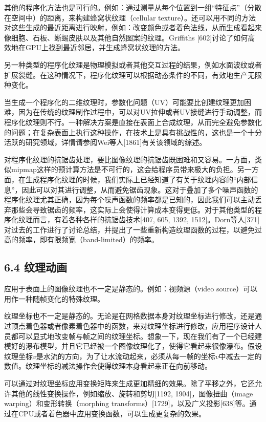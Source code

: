 \documentclass[
  paper=a4,
  ,captions=tableheading
]{scrartcl}
\begin{document}
其他的程序化方法也是可行的。例如：通过测量从每个位置到一组``特征点''（分散在空间中）的距离，来构建蜂窝状纹理（cellular
texture）。还可以用不同的方法对这些生成的最近距离进行映射，例如：改变颜色或者着色法线，从而生成看起来像细胞、石板、蜥蜴皮肤以及其他自然图案的纹理。Griffiths
{[}602{]}讨论了如何高效地在GPU上找到最近邻居，并生成蜂窝状纹理的方法。

另一种类型的程序化纹理是物理模拟或者其他交互过程的结果，例如水面波纹或者扩展裂缝。在这种情况下，程序化纹理可以根据动态条件的不同，有效地生产无限种变化。

当生成一个程序化的二维纹理时，参数化问题（UV）可能要比创建纹理更加困难，因为在传统的纹理制作过程中，可以对UV拉伸或者UV接缝进行手动调整，而程序化纹理则不行。一种解决方案是直接在表面上合成纹理，从而完全避免参数化的问题；在复杂表面上执行这种操作，在技术上是具有挑战性的，这也是一个十分活跃的研究领域，详情请参阅Wei等人{[}1861{]}有关该领域的综述。

对程序化纹理的抗锯齿处理，要比图像纹理的抗锯齿既困难和又容易。一方面，类似mipmap这样的预计算方法是不可行的，这会给程序员带来极大的负担。另一方面，在生成程序化纹理的时候，我们实际上已经知道了有关于纹理内容的``内部信息''，因此可以对其进行调整，从而避免锯齿现象。这对于叠加了多个噪声函数的程序化纹理尤其正确，因为每个噪声函数的频率都是已知的，因此我们可以主动丢弃那些会导致锯齿的频率，这实际上会使得计算成本变得更低。对于其他类型的程序化纹理而言，有着各种各样的抗锯齿技术{[}407,
605, 1392,
1512{]}。Dorn等人{[}371{]}对过去的工作进行了讨论总结，并提出了一些重新构造纹理函数的过程，以避免过高的频率，即有限频宽（band-limited）的频率。

\subsection{6.4 纹理动画}\label{ux7eb9ux7406ux52a8ux753b}

应用于表面上的图像纹理也不一定是静态的。例如：视频源（video
source）可以用作一种随帧变化的特殊纹理。

纹理坐标也不一定是静态的。无论是在网格数据本身对纹理坐标进行修改，还是通过顶点着色器或者像素着色器中的函数，来对纹理坐标进行修改，应用程序设计人员都可以显式地改变帧与帧之间的纹理坐标。想象一下，现在我们有了一个已经建模好的瀑布模型，并且它已经被一个图像纹理化了，使得它看起来很像瀑布。假设纹理坐标\(v\)是水流的方向，为了让水流动起来，必须从每一帧的坐标\(v\)中减去一定的数值。纹理坐标的减法操作会使得纹理本身看起来正在向前移动。

可以通过对纹理坐标应用变换矩阵来生成更加精细的效果。除了平移之外，它还允许其他的线性变换操作，例如缩放、旋转和剪切{[}1192,
1904{]}，图像扭曲（image warping）和变形转换（morphing
transforms）{[}1729{]}，以及广义投影{[}638{]}等。通过在CPU或者着色器中应用变换函数，可以生成更复杂的效果。
\end{document}
